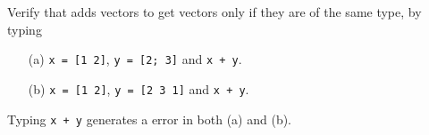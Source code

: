 \documentclass{ximera}
\begin{document}
\begin{computerExercise}  \label{c1.2.2}
Verify that \Matlab adds vectors to get vectors only if they are of the same type, by typing
\begin{enumerate}
\item[(a)]  {\tt x = [1 2]}, {\tt y = [2; 3]} and {\tt x + y}.
\item[(b)]  {\tt x = [1 2]}, {\tt y = [2 3 1]} and {\tt x + y}.
\end{enumerate}

\begin{solution}

\ans Typing {\tt x + y} generates a \Matlab error in both (a) and (b).

\end{solution}
\end{computerExercise}
\end{document}
